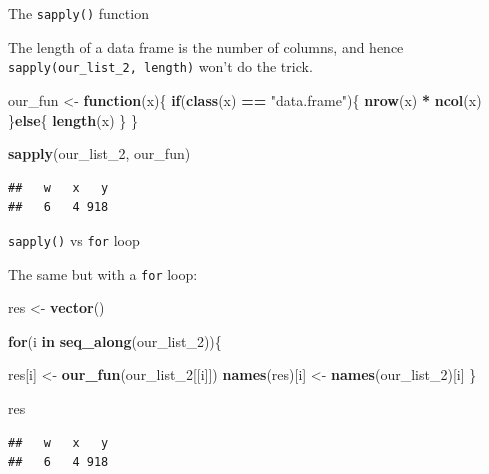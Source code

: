 \documentclass[ignorenonframetext,]{beamer}
\newenvironment{Shaded}{\begin{snugshade}}{\end{snugshade}}
\newcommand{\ControlFlowTok}[1]{\textcolor[rgb]{0.13,0.29,0.53}{\textbf{#1}}}
\newcommand{\DecValTok}[1]{\textcolor[rgb]{0.00,0.00,0.81}{#1}}
\newcommand{\KeywordTok}[1]{\textcolor[rgb]{0.13,0.29,0.53}{\textbf{#1}}}
\newcommand{\NormalTok}[1]{#1}
\newcommand{\OperatorTok}[1]{\textcolor[rgb]{0.81,0.36,0.00}{\textbf{#1}}}
\newcommand{\StringTok}[1]{\textcolor[rgb]{0.31,0.60,0.02}{#1}}
\begin{document}
\begin{frame}[fragile]{The \texttt{sapply()} function}
\protect\hypertarget{the-sapply-function-5}{}

The length of a data frame is the number of columns, and hence
\texttt{sapply(our\_list\_2,\ length)} won't do the trick.

\begin{Shaded}
\begin{Highlighting}[]
\NormalTok{our_fun <-}\StringTok{ }\ControlFlowTok{function}\NormalTok{(x)\{}
  \ControlFlowTok{if}\NormalTok{(}\KeywordTok{class}\NormalTok{(x) }\OperatorTok{==}\StringTok{ "data.frame"}\NormalTok{)\{}
    \KeywordTok{nrow}\NormalTok{(x) }\OperatorTok{*}\StringTok{ }\KeywordTok{ncol}\NormalTok{(x)}
\NormalTok{  \}}\ControlFlowTok{else}\NormalTok{\{}
      \KeywordTok{length}\NormalTok{(x)}
\NormalTok{  \}}
\NormalTok{\}}

\KeywordTok{sapply}\NormalTok{(our_list_}\DecValTok{2}\NormalTok{, our_fun)}
\end{Highlighting}
\end{Shaded}

\begin{verbatim}
##   w   x   y 
##   6   4 918
\end{verbatim}

\end{frame}

\begin{frame}[fragile]{\texttt{sapply()} vs \texttt{for} loop}
\protect\hypertarget{sapply-vs-for-loop}{}

The same but with a \texttt{for} loop:

\begin{Shaded}
\begin{Highlighting}[]
\NormalTok{res <-}\StringTok{ }\KeywordTok{vector}\NormalTok{()}

\ControlFlowTok{for}\NormalTok{(i }\ControlFlowTok{in} \KeywordTok{seq_along}\NormalTok{(our_list_}\DecValTok{2}\NormalTok{))\{}
  
\NormalTok{  res[i] <-}\StringTok{ }\KeywordTok{our_fun}\NormalTok{(our_list_}\DecValTok{2}\NormalTok{[[i]])}
  \KeywordTok{names}\NormalTok{(res)[i] <-}\StringTok{ }\KeywordTok{names}\NormalTok{(our_list_}\DecValTok{2}\NormalTok{)[i] }
\NormalTok{\}}

\NormalTok{res}
\end{Highlighting}
\end{Shaded}

\begin{verbatim}
##   w   x   y 
##   6   4 918
\end{verbatim}

\end{frame}
\end{document}
